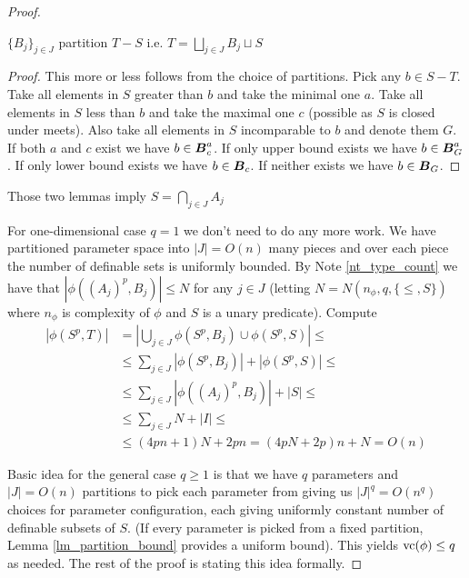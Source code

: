 \documentclass{amsart}
\DeclareMathOperator{\B}{\boldface B}
\begin{document}
\begin{proof}
	\begin{Lemma}
		$\{B_j\}_{j \in J}$ partition $T - S$ i.e. $T = \bigsqcup_{j \in J} B_j \sqcup S$
	\end{Lemma}
	
	\begin{proof}
		This more or less follows from the choice of partitions. Pick any $b \in S - T$. Take all elements in $S$ greater than $b$ and take the minimal one $a$. Take all elements in $S$ less than $b$ and take the maximal one $c$ (possible as $S$ is closed under meets). Also take all elements in $S$ incomparable to $b$ and denote them $G$. If both $a$ and $c$ exist we have $b \in \B^a_c$. If only upper bound exists we have $b \in \B^a_G$. If only lower bound exists we have $b \in \B_c$. If neither exists we have $b \in \B_G$.
	\end{proof}
	
	\begin{Note}
		Those two lemmas imply $S = \bigcap_{j \in J} A_j$
	\end{Note}
	
	\begin{Note}
		For one-dimensional case $q = 1$ we don't need to do any more work. We have partitioned parameter space into $|J| = O(n)$ many pieces and over each piece the number of definable sets is uniformly bounded. By Note \ref{nt_type_count} we have that $|\phi((A_j)^p, B_j)| \leq N$ for any $j \in J$ (letting $N = N(n_\phi, q, \{\leq, S\})$ where $n_\phi$ is complexity of $\phi$ and $S$ is a unary predicate). Compute
		\begin{align*}
			|\phi(S^p, T)|
			&= \left|\bigcup_{j \in J} \phi(S^p, B_j) \cup \phi(S^p, S)\right| \leq \\
			&\leq \sum_{j \in J} |\phi(S^p, B_j)| + |\phi(S^p, S)| \leq \\
			&\leq \sum_{j \in J} |\phi((A_j)^p, B_j)| + |S| \leq \\
			&\leq \sum_{j \in J}N + |I| \leq \\
			&\leq (4pn + 1)N + 2pn = (4pN + 2p)n + N = O(n)
		\end{align*}
	\end{Note}
	Basic idea for the general case $q \geq 1$ is that we have $q$ parameters and $|J| = O(n)$ partitions to pick each parameter from giving us $|J|^q = O(n^q)$ choices for parameter configuration, each giving uniformly constant number of definable subsets of $S$. (If every parameter is picked from a fixed partition, Lemma \ref{lm_partition_bound} provides a uniform bound). This yields $\operatorname{vc}(\phi) \leq q$ as needed. The rest of the proof is stating this idea formally.
	

\end{proof}
\end{document}
